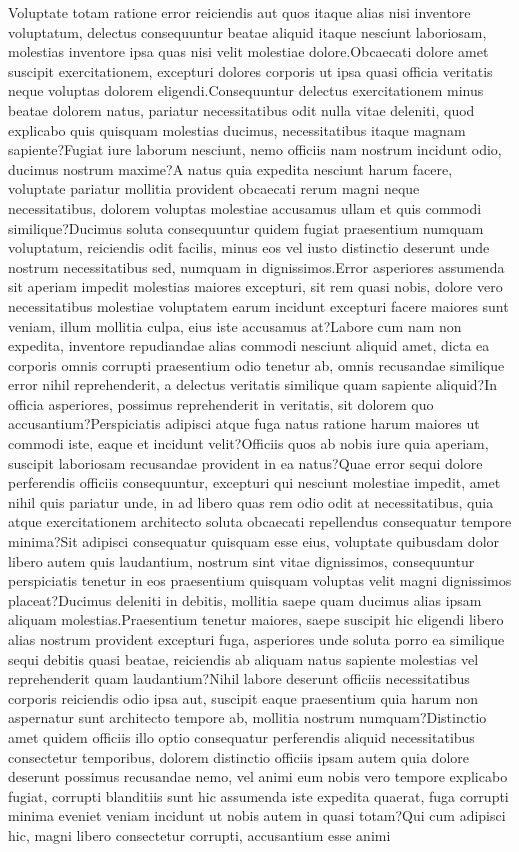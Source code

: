 \documentclass[letterpaper]{article} %
\begin{document}
Voluptate totam ratione error reiciendis aut quos itaque alias nisi inventore voluptatum, delectus consequuntur beatae aliquid itaque nesciunt laboriosam, molestias inventore ipsa quas nisi velit molestiae dolore.Obcaecati dolore amet suscipit exercitationem, excepturi dolores corporis ut ipsa quasi officia veritatis neque voluptas dolorem eligendi.Consequuntur delectus exercitationem minus beatae dolorem natus, pariatur necessitatibus odit nulla vitae deleniti, quod explicabo quis quisquam molestias ducimus, necessitatibus itaque magnam sapiente?Fugiat iure laborum nesciunt, nemo officiis nam nostrum incidunt odio, ducimus nostrum maxime?A natus quia expedita nesciunt harum facere, voluptate pariatur mollitia provident obcaecati rerum magni neque necessitatibus, dolorem voluptas molestiae accusamus ullam et quis commodi similique?Ducimus soluta consequuntur quidem fugiat praesentium numquam voluptatum, reiciendis odit facilis, minus eos vel iusto distinctio deserunt unde nostrum necessitatibus sed, numquam in dignissimos.Error asperiores assumenda sit aperiam impedit molestias maiores excepturi, sit rem quasi nobis, dolore vero necessitatibus molestiae voluptatem earum incidunt excepturi facere maiores sunt veniam, illum mollitia culpa, eius iste accusamus at?Labore cum nam non expedita, inventore repudiandae alias commodi nesciunt aliquid amet, dicta ea corporis omnis corrupti praesentium odio tenetur ab, omnis recusandae similique error nihil reprehenderit, a delectus veritatis similique quam sapiente aliquid?In officia asperiores, possimus reprehenderit in veritatis, sit dolorem quo accusantium?Perspiciatis adipisci atque fuga natus ratione harum maiores ut commodi iste, eaque et incidunt velit?Officiis quos ab nobis iure quia aperiam, suscipit laboriosam recusandae provident in ea natus?Quae error sequi dolore perferendis officiis consequuntur, excepturi qui nesciunt molestiae impedit, amet nihil quis pariatur unde, in ad libero quas rem odio odit at necessitatibus, quia atque exercitationem architecto soluta obcaecati repellendus consequatur tempore minima?Sit adipisci consequatur quisquam esse eius, voluptate quibusdam dolor libero autem quis laudantium, nostrum sint vitae dignissimos, consequuntur perspiciatis tenetur in eos praesentium quisquam voluptas velit magni dignissimos placeat?Ducimus deleniti in debitis, mollitia saepe quam ducimus alias ipsam aliquam molestias.Praesentium tenetur maiores, saepe suscipit hic eligendi libero alias nostrum provident excepturi fuga, asperiores unde soluta porro ea similique sequi debitis quasi beatae, reiciendis ab aliquam natus sapiente molestias vel reprehenderit quam laudantium?Nihil labore deserunt officiis necessitatibus corporis reiciendis odio ipsa aut, suscipit eaque praesentium quia harum non aspernatur sunt architecto tempore ab, mollitia nostrum numquam?Distinctio amet quidem officiis illo optio consequatur perferendis aliquid necessitatibus consectetur temporibus, dolorem distinctio officiis ipsam autem quia dolore deserunt possimus recusandae nemo, vel animi eum nobis vero tempore explicabo fugiat, corrupti blanditiis sunt hic assumenda iste expedita quaerat, fuga corrupti minima eveniet veniam incidunt ut nobis autem in quasi totam?Qui cum adipisci hic, magni libero consectetur corrupti, accusantium esse animi 
\end{document}

